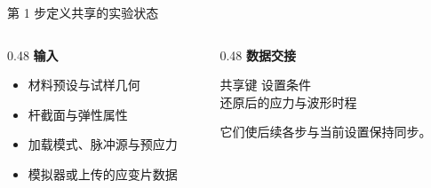 \documentclass[11pt,aspectratio=169]{beamer}
\begin{document}
\begin{frame}{第 1 步定义共享的实验状态}
  \begin{columns}[T,onlytextwidth]
    \begin{column}{0.48\textwidth}
      \textbf{输入}
      \begin{itemize}
        \item 材料预设与试样几何
        \item 杆截面与弹性属性
        \item 加载模式、脉冲源与预应力
        \item 模拟器或上传的应变片数据
      \end{itemize}
    \end{column}
    \begin{column}{0.48\textwidth}
      \textbf{数据交接}
      \begin{block}{共享键}
        设置条件\\
        还原后的应力与波形时程
      \end{block}
      它们使后续各步与当前设置保持同步。
    \end{column}
  \end{columns}
\end{frame}
\end{document}
